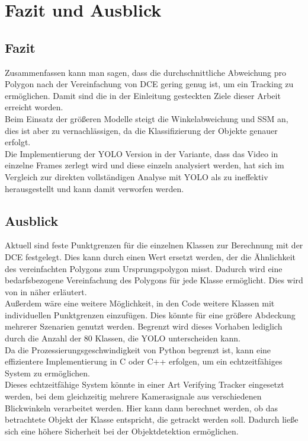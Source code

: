 \chapter{Fazit und Ausblick}
\label{ch:conclusion}
\section{Fazit}
{
    Zusammenfassen kann man sagen, dass die durchschnittliche Abweichung pro Polygon nach der Vereinfachung von DCE gering genug ist, um ein Tracking zu ermöglichen. Damit sind die in der Einleitung gesteckten Ziele dieser Arbeit erreicht worden. \\
	Beim Einsatz der größeren Modelle steigt die Winkelabweichung und SSM an, dies ist aber zu vernachlässigen, da die Klassifizierung der Objekte genauer erfolgt.  \\
	Die Implementierung der YOLO Version in der Variante, dass das Video in einzelne Frames zerlegt wird und diese einzeln analysiert werden, hat sich im Vergleich zur direkten vollständigen Analyse mit YOLO als zu ineffektiv herausgestellt und kann damit verworfen werden.
    }
\section{Ausblick}
{
	Aktuell sind feste Punktgrenzen für die einzelnen Klassen zur Berechnung mit der DCE festgelegt. Dies kann durch einen Wert ersetzt werden, der die Ähnlichkeit des vereinfachten Polygons zum Ursprungspolygon misst. Dadurch wird eine bedarfsbezogene Vereinfachung des Polygons für jede Klasse ermöglicht. Dies wird von \citeauthor{Latecki2003} in  \citep{Latecki2003} näher erläutert. \\
	Außerdem wäre eine weitere Möglichkeit, in den Code weitere Klassen mit individuellen Punktgrenzen einzufügen. Dies könnte für eine größere Abdeckung mehrerer Szenarien genutzt werden. Begrenzt wird dieses Vorhaben lediglich durch die Anzahl der 80 Klassen, die YOLO unterscheiden kann. \\
	Da die Prozessierungsgeschwindigkeit von Python begrenzt ist, kann eine effizientere Implementierung in C oder C++ erfolgen, um ein echtzeitfähiges System zu ermöglichen. \\
	Dieses echtzeitfähige System könnte in einer Art \glqq Verifying Tracker\grqq{} eingesetzt werden, bei dem gleichzeitig mehrere Kamerasignale aus verschiedenen Blickwinkeln verarbeitet werden.  Hier kann dann berechnet werden, ob das betrachtete Objekt der Klasse entspricht, die getrackt werden soll. Dadurch ließe sich eine höhere Sicherheit bei der Objektdetektion ermöglichen.

}

